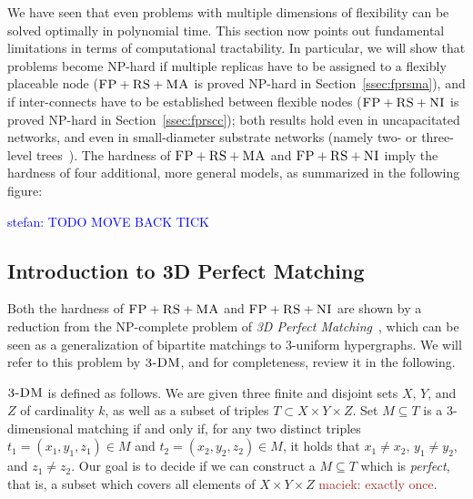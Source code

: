 \documentclass[9pt]{sigcomm-alternate}
\newcommand{\maciek}[1]{\textcolor{brown}{maciek: #1}}
\newcommand{\stefan}[1]{\textcolor{blue}{stefan: #1}}
\newcommand{\CC}{\textsc{NI}}
\newcommand{\FP}{\textsc{FP}}
\newcommand{\RS}{\textsc{RS}}
\newcommand{\MA}{\textsc{MA}}
\newcommand{\TDM}{\textsc{3-DM}}
\begin{document}
We have seen that even problems with multiple dimensions of
flexibility can be solved optimally in polynomial time.
This section now points out fundamental
limitations in terms of computational tractability. In particular, we
will show that problems become NP-hard if multiple replicas have to be
assigned to a flexibly placeable node ($\FP+\RS+\MA$ is proved NP-hard in
Section~\ref{ssec:fprsma}), and if inter-connects have to be established
between flexible nodes ($\FP+\RS+\CC$ is proved NP-hard in Section~\ref{ssec:fprscc}); both
results hold even in uncapacitated networks, and even in small-diameter
substrate networks (namely two- or three-level trees~\cite{fattree}).
The hardness of $\FP+\RS+\MA$ and $\FP+\RS+\CC$ imply
the hardness of four additional, more general models, as
summarized in the following figure:

\stefan{TODO MOVE BACK TICK}


\subsection{Introduction to 3D Perfect Matching}

Both the hardness of $\FP+\RS+\MA$ and $\FP+\RS+\CC$ are shown by a reduction
from the NP-complete problem of \emph{3D Perfect Matching}~\cite{3dmatch},
which
can be seen as a generalization of bipartite matchings to 3-uniform
hypergraphs. We will refer to this problem by $\TDM$, and for completeness,
review it in the following.

$\TDM$ is defined as follows. We are given three finite and disjoint
sets $X$, $Y$, and $Z$ of cardinality $k$, as well as a subset of triples $T\subset
X \times Y \times Z$.  Set $M \subseteq T$ is a 3-dimensional matching
if and only if, for any two distinct triples $t_1=(x_1, y_1, z_1) \in M$
and $t_2=(x_2, y_2, z_2) \in M$, it holds that $x_1\neq x_2$, $y_1\neq
y_2$, and $z_1\neq z_2$. Our goal is to decide if we can construct
a $M \subseteq T$ which is \emph{perfect}, that is, a subset which covers all
elements of $X \times Y \times Z$ \maciek{exactly once}.
\end{document}
